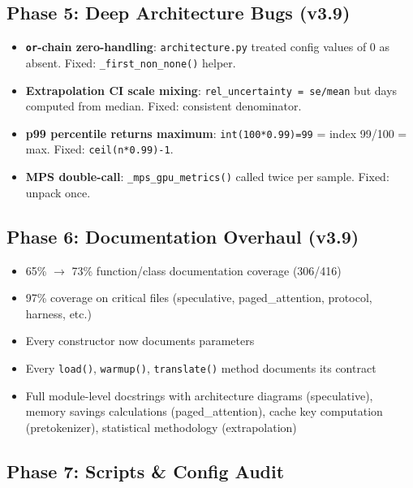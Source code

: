 \documentclass[11pt,a4paper,twoside]{article}
\begin{document}
\subsection{Phase 5: Deep Architecture Bugs (v3.9)}

\begin{itemize}[nosep]
  \item \textbf{\texttt{or}-chain zero-handling}: \texttt{architecture.py} treated
    config values of 0 as absent. Fixed: \texttt{\_first\_non\_none()} helper.
  \item \textbf{Extrapolation CI scale mixing}: \texttt{rel\_uncertainty = se/mean}
    but days computed from median. Fixed: consistent denominator.
  \item \textbf{p99 percentile returns maximum}: \texttt{int(100*0.99)=99} =
    index 99/100 = max. Fixed: \texttt{ceil(n*0.99)-1}.
  \item \textbf{MPS double-call}: \texttt{\_mps\_gpu\_metrics()} called twice per
    sample. Fixed: unpack once.
\end{itemize}

\subsection{Phase 6: Documentation Overhaul (v3.9)}

\begin{itemize}[nosep]
  \item 65\% $\rightarrow$ 73\% function/class documentation coverage (306/416)
  \item 97\% coverage on critical files (speculative, paged\_attention, protocol,
    harness, etc.)
  \item Every constructor now documents parameters
  \item Every \texttt{load()}, \texttt{warmup()}, \texttt{translate()} method
    documents its contract
  \item Full module-level docstrings with architecture diagrams (speculative),
    memory savings calculations (paged\_attention), cache key computation
    (pretokenizer), statistical methodology (extrapolation)
\end{itemize}

\subsection{Phase 7: Scripts \& Config Audit}
\end{document}
